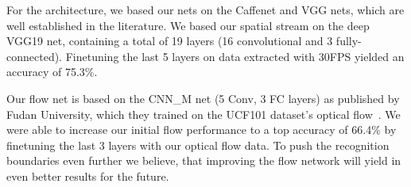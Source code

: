 For the architecture, we based our nets on the Caffenet and VGG nets, which are well established in the literature.
We based our spatial stream on the deep VGG19 net, containing a total of 19 layers (16 convolutional and 3 fully-connected).
Finetuning the last 5 layers on data extracted with 30FPS yielded an accuracy of 75.3\%.

Our flow net is based on the CNN\_M net (5 Conv, 3 FC layers) as published by Fudan University, which they trained on the UCF101 dataset's optical flow~\cite{wu2015modeling}.
We were able to increase our initial flow performance to a top accuracy of 66.4\% by finetuning the last 3 layers with our optical flow data.
To push the recognition boundaries even further we believe, that improving the flow network will yield in even better results for the future.
